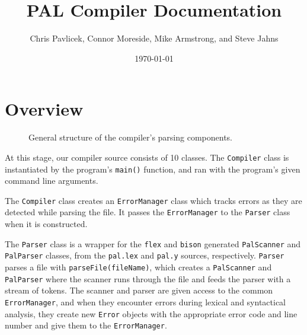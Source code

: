 \documentclass{article}
\begin{document}
\title{PAL Compiler Documentation }
\date{\today}
\author{Chris Pavlicek, Connor Moreside, Mike Armstrong, and Steve Jahns}
\maketitle

%
%

\section*{Overview}

\begin{figure}[h!]
\caption{General structure of the compiler's parsing components.}
\end{figure}

At this stage, our compiler source consists of 10 classes. The \texttt{Compiler} class is instantiated by 
the program's \texttt{main()} function, and ran with the program's given command line arguments. 

The \texttt{Compiler} class creates an \texttt{ErrorManager}
class which tracks errors as they are detected while parsing the file. It passes the \texttt{ErrorManager}
to the \texttt{Parser} class when it is constructed.

The \texttt{Parser} class is a wrapper for the \texttt{flex} and \texttt{bison}
generated \texttt{PalScanner} and \texttt{PalParser} classes, from the
\texttt{pal.lex} and \texttt{pal.y} sources, respectively. \texttt{Parser}
parses a file with \texttt{parseFile(fileName)}, which creates a
\texttt{PalScanner} and \texttt{PalParser} where the scanner runs through
the file and feeds the parser with a stream of tokens.  The scanner and
parser are given access to the common \texttt{ErrorManager}, and when they
encounter errors during lexical and syntactical analysis, they create new
\texttt{Error} objects with the appropriate error code and line number and
give them to the \texttt{ErrorManager}.
\end{document}
